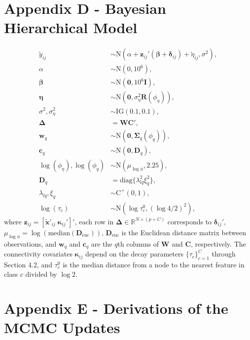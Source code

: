 \documentclass{article}
\begin{document}
\section*{Appendix D - Bayesian Hierarchical Model}\label{app:model}
\begin{align*}
    \widetilde{y}_{ij} &\sim \text{N}\left(\alpha +\mathbf{z}_{ij}'(\boldsymbol{\beta}+\boldsymbol{\delta}_{ij})+\widetilde{\eta}_{ij},\sigma^2\right),\\
    \alpha &\sim \text{N}(0, 10^6),\\
    \boldsymbol{\beta} &\sim \text{N}(\boldsymbol{0},10^6\mathbf{I}),\\
    \boldsymbol{\eta} &\sim \text{N}(\boldsymbol{0},\sigma^2_\eta\mathbf{R}(\phi_\eta)),\\
    \sigma^2,\sigma^2_\eta &\sim \text{IG}(0.1,0.1),\\
     \boldsymbol{\Delta} &= \mathbf{WC}',\\
    \mathbf{w}_q &\sim \text{N}(\boldsymbol{0},\boldsymbol\Sigma_q(\phi_q)),\\
    \mathbf{c}_q &\sim \text{N}(\boldsymbol{0},\mathbf{D}_q),\\
    \log(\phi_\eta),\log(\phi_q) &\sim \text{N}(\mu_{\log\phi},2.25),\\
    \mathbf{D}_q &= \text{diag}\{\lambda^2_{lq}\xi^2_q\},\\
    \lambda_{lq},\xi_q &\sim \text{C}^+(0,1),\\
    \log(\tau_c) &\sim \text{N}(\log\tau^0_c,(\log 4/2)^2),
\end{align*}
where $\mathbf{z}_{ij}=[\widetilde{\mathbf{x}}'_{ij} \;\boldsymbol{\kappa}_{ij}']'$, each row in $\boldsymbol\Delta\in\mathbb{R}^{N\times (p+C)}$ corresponds to $\boldsymbol\delta_{ij}'$, $\mu_{\log\phi}=\log(\text{median}(\mathbf{D}_{\text{euc}}))$, $\mathbf{D}_{\text{euc}}$ is the Euclidean distance matrix between observations, and $\mathbf{w}_q$ and $\mathbf{c}_q$ are the $q$th columns of $\mathbf{W}$ and $\mathbf{C}$, respectively. The connectivity covariates $\boldsymbol{\kappa}_{ij}$ depend on the decay parameters $\{\tau_c\}^C_{c=1}$ through Section 4.2, and $\tau^0_c$ is the median distance from a node to the nearest feature in class $c$ divided by $\log2$.

\section*{Appendix E - Derivations of the MCMC Updates}
\end{document}

